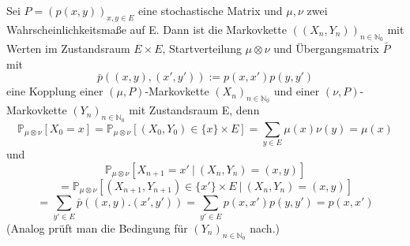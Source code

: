 \label{BSP unabhängige Kopplung}
Sei $P = (p(x,y))_{x,y \in E}$ eine stochastische Matrix und $\mu, \nu$ zwei Wahrscheinlichkeitsmaße auf E. Dann ist die Markovkette  $((X_{n},Y_{n}))_{n \in \mathbb{N}_{0}}$ mit Werten im Zustandsraum $E \times E$, Startverteilung $\mu \otimes \nu$ und Übergangsmatrix $\bar{P}$ mit
\begin{equation*}
\bar{p} \left( (x,y),(x',y') \right) := p(x,x')p(y,y')
\end{equation*}
eine Kopplung einer $(\mu,P)$-Markovkette $(X_{n})_{n \in \mathbb{N}_{0}}$ und einer $(\nu,P)$-Markovkette $(Y_{n})_{n \in \mathbb{N}_{0}}$ mit Zustandsraum E, denn
\begin{equation*}
\mathbb{P}_{\mu \otimes \nu}[X_{0} =x] = \mathbb{P}_{\mu \otimes \nu}[(X_{0},Y_{0}) \in \lbrace x \rbrace \times E] = \sum_{y \in E} \mu(x) \nu(y) = \mu(x)
\end{equation*}
und
\begin{equation*}
\mathbb{P}_{\mu \otimes \nu}[X_{n+1}=x' \: | \: (X_{n},Y_{n}) = (x,y)]
\end{equation*}
\begin{equation*}
= \mathbb{P}_{\mu \otimes \nu}[(X_{n+1},Y_{n+1}) \in \lbrace x' \rbrace \times E \: | \: (X_{n},Y_{n}) = (x,y)]
\end{equation*}
\begin{equation*}
= \sum_{y' \in E} \bar{p} \left( (x,y).(x',y') \right) = \sum_{y' \in E} p(x,x')p(y,y') = p(x,x')
\end{equation*}
(Analog prüft man die Bedingung für $(Y_{n})_{n \in \mathbb{N}_{0}}$ nach.)
